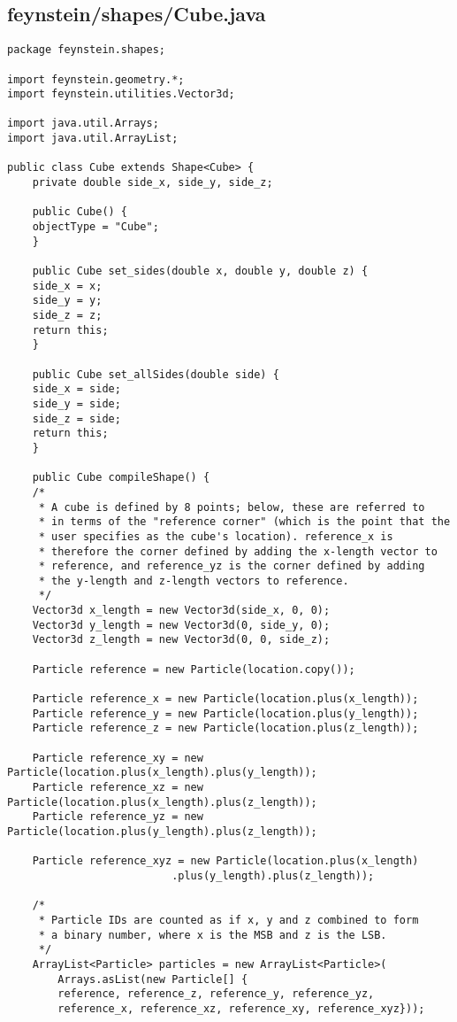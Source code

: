 \subsection*{feynstein/shapes/Cube.java}
\begin{lstlisting}
package feynstein.shapes;

import feynstein.geometry.*;
import feynstein.utilities.Vector3d;

import java.util.Arrays;
import java.util.ArrayList;

public class Cube extends Shape<Cube> {
    private double side_x, side_y, side_z;

    public Cube() {
	objectType = "Cube";
    }

    public Cube set_sides(double x, double y, double z) {
	side_x = x;
	side_y = y;
	side_z = z;
	return this;
    }

    public Cube set_allSides(double side) {
	side_x = side;
	side_y = side;
	side_z = side;
	return this;
    }

    public Cube compileShape() {
	/*
	 * A cube is defined by 8 points; below, these are referred to
	 * in terms of the "reference corner" (which is the point that the
	 * user specifies as the cube's location). reference_x is
	 * therefore the corner defined by adding the x-length vector to
	 * reference, and reference_yz is the corner defined by adding
	 * the y-length and z-length vectors to reference.
	 */
	Vector3d x_length = new Vector3d(side_x, 0, 0);
	Vector3d y_length = new Vector3d(0, side_y, 0);
	Vector3d z_length = new Vector3d(0, 0, side_z);

	Particle reference = new Particle(location.copy());

	Particle reference_x = new Particle(location.plus(x_length));
	Particle reference_y = new Particle(location.plus(y_length));
	Particle reference_z = new Particle(location.plus(z_length));

	Particle reference_xy = new Particle(location.plus(x_length).plus(y_length));
	Particle reference_xz = new Particle(location.plus(x_length).plus(z_length));
	Particle reference_yz = new Particle(location.plus(y_length).plus(z_length));

	Particle reference_xyz = new Particle(location.plus(x_length)
					      .plus(y_length).plus(z_length));

	/*
	 * Particle IDs are counted as if x, y and z combined to form
	 * a binary number, where x is the MSB and z is the LSB.
	 */
	ArrayList<Particle> particles = new ArrayList<Particle>(
	    Arrays.asList(new Particle[] {
		reference, reference_z, reference_y, reference_yz, 
		reference_x, reference_xz, reference_xy, reference_xyz}));


\end{lstlisting}
